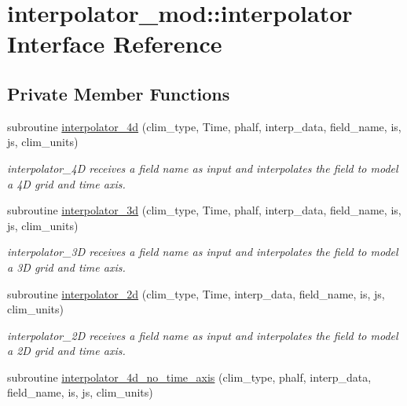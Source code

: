 \hypertarget{interfaceinterpolator__mod_1_1interpolator}{}\section{interpolator\+\_\+mod\+:\+:interpolator Interface Reference}
\label{interfaceinterpolator__mod_1_1interpolator}
\subsection*{Private Member Functions}
\begin{DoxyCompactItemize}
\item 
subroutine \hyperlink{interfaceinterpolator__mod_1_1interpolator_ae79df7db04c5ee92ce397eec4312d9ca}{interpolator\+\_\+4d} (clim\+\_\+type, Time, phalf, interp\+\_\+data, field\+\_\+name, is, js, clim\+\_\+units)
\begin{DoxyCompactList}\small\item\em interpolator\+\_\+4D receives a field name as input and interpolates the field to model a 4D grid and time axis. \end{DoxyCompactList}\item 
subroutine \hyperlink{interfaceinterpolator__mod_1_1interpolator_ad7d266557fa3f3eb86bb255494351966}{interpolator\+\_\+3d} (clim\+\_\+type, Time, phalf, interp\+\_\+data, field\+\_\+name, is, js, clim\+\_\+units)
\begin{DoxyCompactList}\small\item\em interpolator\+\_\+3D receives a field name as input and interpolates the field to model a 3D grid and time axis. \end{DoxyCompactList}\item 
subroutine \hyperlink{interfaceinterpolator__mod_1_1interpolator_ac82067012c474cd9d2a28e09e0f4e6d0}{interpolator\+\_\+2d} (clim\+\_\+type, Time, interp\+\_\+data, field\+\_\+name, is, js, clim\+\_\+units)
\begin{DoxyCompactList}\small\item\em interpolator\+\_\+2D receives a field name as input and interpolates the field to model a 2D grid and time axis. \end{DoxyCompactList}\item 
subroutine \hyperlink{interfaceinterpolator__mod_1_1interpolator_a962960829f0f07d3a87e017f0b5cd58d}{interpolator\+\_\+4d\+\_\+no\+\_\+time\+\_\+axis} (clim\+\_\+type, phalf, interp\+\_\+data, field\+\_\+name, is, js, clim\+\_\+units)

\end{DoxyCompactItemize}

